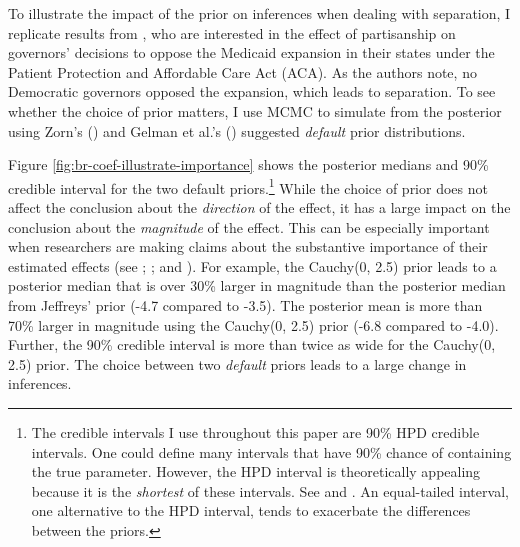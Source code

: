 \documentclass[12pt]{article}
\begin{document}
To illustrate the impact of the prior on inferences when dealing with separation, I replicate results from \cite{BarrilleauxRainey2014, barrilleaux-rainey-data}, who are interested in the effect of partisanship on governors' decisions to oppose the Medicaid expansion in their states under the Patient Protection and Affordable Care Act (ACA).
As the authors note, no Democratic governors opposed the expansion, which leads to separation. 
To see whether the choice of prior matters, I use MCMC to simulate from the posterior using Zorn's (\citeyear{Zorn2005}) and Gelman et al.'s (\citeyear{Gelmanetal2008}) suggested \emph{default} prior distributions. 

Figure \ref{fig:br-coef-illustrate-importance} shows the posterior medians and 90\% credible interval for the two default priors.\footnote{
The credible intervals I use throughout this paper are 90\% HPD credible intervals. 
One could define many intervals that have 90\% chance of containing the true parameter.
 However, the HPD interval is theoretically appealing because it is the \emph{shortest} of these intervals. 
 See \citet[esp. pp. 48-51]{Gill2008} and \citet[esp. p. 448]{CasellaBerger2002}. 
 An equal-tailed interval, one alternative to the HPD interval, tends to exacerbate the differences between the priors.} 
 While the choice of prior does not affect the conclusion about the \emph{direction} of the effect, it has a large impact on the conclusion about the \emph{magnitude} of the effect. 
 This can be especially important when researchers are making claims about the substantive importance of their estimated effects (see \citealt{KingTomzWittenberg2000}; \citealt{Rainey2014a}; and \citealt{Gross2014}). 
 For example, the Cauchy(0, 2.5) prior leads to a posterior median that is over 30\% larger in magnitude than the posterior median from Jeffreys' prior (-4.7 compared to -3.5). 
 The posterior mean is more than 70\% larger in magnitude using the Cauchy(0, 2.5) prior (-6.8 compared to -4.0). 
 Further, the 90\% credible interval is more than twice as wide for the Cauchy(0, 2.5) prior. 
 The choice between two \emph{default} priors leads to a large change in inferences.
\end{document}
